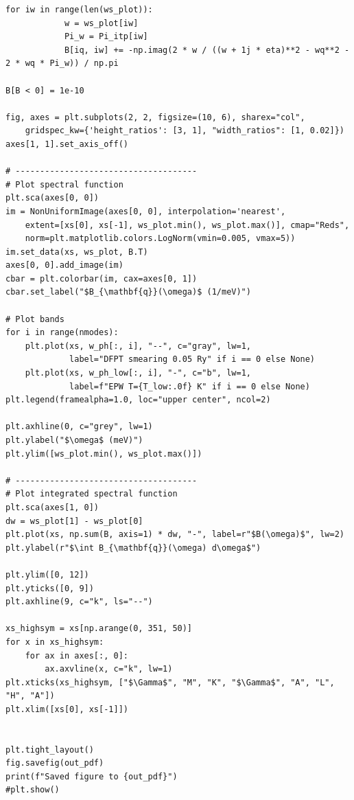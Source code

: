 \documentclass[a4paper,11pt,serif]{article}
\begin{document}
\begin{scriptsize}
\begin{Verbatim}[frame=single]
        for iw in range(len(ws_plot)):
            w = ws_plot[iw]
            Pi_w = Pi_itp[iw]
            B[iq, iw] += -np.imag(2 * w / ((w + 1j * eta)**2 - wq**2 - 2 * wq * Pi_w)) / np.pi

B[B < 0] = 1e-10

fig, axes = plt.subplots(2, 2, figsize=(10, 6), sharex="col",
    gridspec_kw={'height_ratios': [3, 1], "width_ratios": [1, 0.02]})
axes[1, 1].set_axis_off()

# -------------------------------------
# Plot spectral function
plt.sca(axes[0, 0])
im = NonUniformImage(axes[0, 0], interpolation='nearest',
    extent=[xs[0], xs[-1], ws_plot.min(), ws_plot.max()], cmap="Reds",
    norm=plt.matplotlib.colors.LogNorm(vmin=0.005, vmax=5))
im.set_data(xs, ws_plot, B.T)
axes[0, 0].add_image(im)
cbar = plt.colorbar(im, cax=axes[0, 1])
cbar.set_label("$B_{\mathbf{q}}(\omega)$ (1/meV)")

# Plot bands
for i in range(nmodes):
    plt.plot(xs, w_ph[:, i], "--", c="gray", lw=1,
             label="DFPT smearing 0.05 Ry" if i == 0 else None)
    plt.plot(xs, w_ph_low[:, i], "-", c="b", lw=1,
             label=f"EPW T={T_low:.0f} K" if i == 0 else None)
plt.legend(framealpha=1.0, loc="upper center", ncol=2)

plt.axhline(0, c="grey", lw=1)
plt.ylabel("$\omega$ (meV)")
plt.ylim([ws_plot.min(), ws_plot.max()])

# -------------------------------------
# Plot integrated spectral function
plt.sca(axes[1, 0])
dw = ws_plot[1] - ws_plot[0]
plt.plot(xs, np.sum(B, axis=1) * dw, "-", label=r"$B(\omega)$", lw=2)
plt.ylabel(r"$\int B_{\mathbf{q}}(\omega) d\omega$")

plt.ylim([0, 12])
plt.yticks([0, 9])
plt.axhline(9, c="k", ls="--")

xs_highsym = xs[np.arange(0, 351, 50)]
for x in xs_highsym:
    for ax in axes[:, 0]:
        ax.axvline(x, c="k", lw=1)
plt.xticks(xs_highsym, ["$\Gamma$", "M", "K", "$\Gamma$", "A", "L", "H", "A"])
plt.xlim([xs[0], xs[-1]])


plt.tight_layout()
fig.savefig(out_pdf)
print(f"Saved figure to {out_pdf}")
#plt.show()
\end{Verbatim}
\end{scriptsize}
\end{document}
